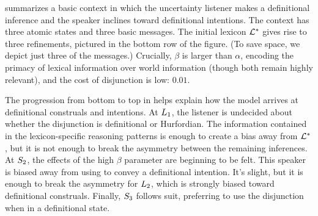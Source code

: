 \documentclass[12pt,twoside]{article}
\renewcommand{\_}{\textbf{\textunderscore\hspace{-4pt}\textunderscore\hspace{-3pt}\textunderscore\hspace{-4pt}\textunderscore}\hspace{0.5pt}}			%
\begin{document}
 summarizes a basic context in which the uncertainty
listener makes a definitional inference and the speaker inclines
toward definitional intentions. The context has three atomic states
and three basic messages. The initial lexicon $\LexStar$ gives rise to
three refinements, pictured in the bottom row of the figure. (To save
space, we depict just three of the messages.)  Crucially, $\beta$ is
larger than $\alpha$, encoding the primacy of lexical information over
world information (though both remain highly relevant), and the cost
of disjunction is low: $0.01$.

The progression from bottom to top in  helps explain
how the model arrives at definitional construals and intentions.  At
$\ListenerK[1]$, the listener is undecided about whether the
disjunction is definitional or Hurfordian. The information contained
in the lexicon-specific reasoning patterns is enough to create a bias
away from $\LexStar$, but it is not enough to break the asymmetry
between the remaining inferences. At $\SpeakerK[2]$, the effects of
the high $\beta$ parameter are beginning to be felt. This speaker is
biased away from using  to convey a definitional
intention. It's slight, but it is enough to break the asymmetry for
$\ListenerK[2]$, which is strongly biased toward definitional
construals. Finally, $\SpeakerK[3]$ follows suit, preferring to use
the disjunction when in a definitional state.
\end{document}
